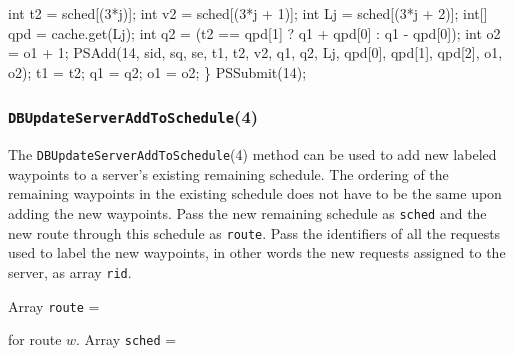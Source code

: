 \documentclass{article}
\def\nwendcode{\endtrivlist \endgroup}
\let\nwdocspar=\par
\theoremstyle{definition}
\begin{document}
  int t2 = sched[(3*j)];
  int v2 = sched[(3*j + 1)];
  int Lj = sched[(3*j + 2)];
  int[] qpd = cache.get(Lj);
  int q2 = (t2 == qpd[1] ? q1 + qpd[0] : q1 - qpd[0]);
  int o2 = o1 + 1;
  PSAdd(14, sid, sq, se, t1, t2, v2, q1, q2, Lj,
        qpd[0], qpd[1], qpd[2], o1, o2);
  t1 = t2;
  q1 = q2;
  o1 = o2;
\}
PSSubmit(14);
\nwendcode{}\nwdocspar

\subsubsection{{\tt{}\protect{}DBUpdateServerAddToSchedule}(4)}
The {\tt{}\protect{}DBUpdateServerAddToSchedule}(4) method can be used to add new labeled
waypoints to a server's existing remaining schedule. The ordering of the
remaining waypoints in the existing schedule does not have to be the same
upon adding the new waypoints. Pass the new remaining schedule as {\tt{}sched} and
the new route through this schedule as {\tt{}route}. Pass the identifiers of all
the requests used to label the new waypoints, in other words the new
requests assigned to the server, as array {\tt{}rid}.

Array {\tt{}route} =

\noindent
{}

\noindent for route $w$. Array {\tt{}sched} =

\noindent
{}
\end{document}
